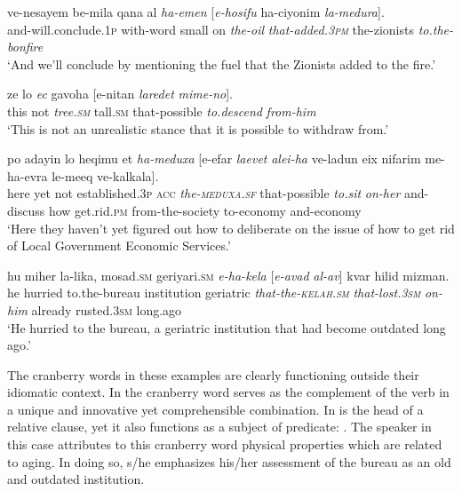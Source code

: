 \documentclass[output=paper]{langsci/langscibook}
\begin{document}
    \ea\label{she:medura-rc}
        \gll ve-nesayem be-mila q{\tet}ana {\ayin}al \textit{ha-{\shin}emen} \textnormal{[}\textit{{\shin}e-hosifu} ha-ciyonim \textit{la-medura}\textnormal{]}.\\
            and-will.conclude.\textsc{1p} with-word small on \textit{the-oil} \textit{that-added.\textsc{3pm}} the-zionists \textit{{to.the-bonfire}}\\
        \glt `And we'll conclude by mentioning the fuel that the Zionists added to the fire.'
    \z

    \ea\label{she:ec-rc}
        \gll ze lo \textit{{\ayin}ec} gavoha \textnormal{[}{\shin}e-nitan \textit{laredet} \textit{mime-no}\textnormal{]}.\\
            this not  \textit{tree.\textsc{sm}} tall.\textsc{sm} \spacebr{}that-possible \textit{to.descend} \textit{from-him}\\
        \glt `This is not an unrealistic stance that it is possible to withdraw from.'
    \z

    \ea\label{she:meduxa-rc}
        \gll po {\ayin}adayin lo heqimu {\alef}et \textit{ha-meduxa} \textnormal{[}{\shin}e-{\alef}ef{\shin}ar \textit{la{\shin}evet} \textit{{\ayin}alei-ha} ve-ladun {\alef}eix nif{\tet}arim me-ha-{\het}evra le-me{\shin}eq ve-kalkala\textnormal{]}.\\
            here yet not established.\textsc{3p} \textsc{acc} \textit{the-\textsc{meduxa}.\textsc{sf}} \spacebr{}that-possible \textit{to.sit} \textit{on-her} and-discuss how get.rid.\textsc{pm} from-the-society to-economy and-economy\\
        \glt `Here they haven't yet figured out how to deliberate on the issue of how to get rid of Local Government Economic Services.'
    \z

    \ea\label{she:kelax-rc}
        \gll hu miher la-li{\shin}ka, mosad.\textsc{sm} geriya{\tet}ri.\textsc{sm} \textit{{\shin}e-ha-kela{\het}} \textnormal{[}\textit{{\shin}e-{\alef}avad} \textit{{\ayin}al-av}\textnormal{]} kvar hi{\het}lid mizman.\\
            he hurried to.the-bureau institution geriatric \textit{that-the-\textsc{kelah}.\textsc{sm}} \spacebr{}\textit{that-lost.\textsc{3sm}} \textit{on-him} already rusted.\textsc{3sm} long.ago\\
        \glt `He hurried to the bureau, a geriatric institution that had become outdated long ago.'
    \z

The cranberry words in these examples are clearly functioning outside their idiomatic context. In  the cranberry word  serves as the complement of the verb  in a unique and innovative yet comprehensible combination. In   is the head of a relative clause, yet it also functions as a subject of predicate: . The speaker in this case attributes to this cranberry word physical properties which are related to aging. In doing so, s/he emphasizes his/her assessment of the bureau as an old and outdated institution.
\end{document}
